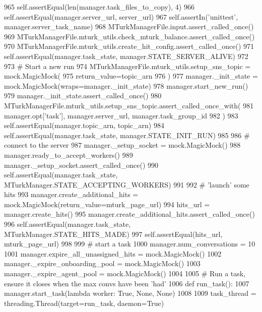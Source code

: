 \begin{DoxyCode}
965         self.assertEqual(len(manager.task\_files\_to\_copy), 4)
966         self.assertEqual(manager.server\_url, server\_url)
967         self.assertIn(\textcolor{stringliteral}{'unittest'}, manager.server\_task\_name)
968         MTurkManagerFile.input.assert\_called\_once()
969         MTurkManagerFile.mturk\_utils.check\_mturk\_balance.assert\_called\_once()
970         MTurkManagerFile.mturk\_utils.create\_hit\_config.assert\_called\_once()
971         self.assertEqual(manager.task\_state, manager.STATE\_SERVER\_ALIVE)
972 
973         \textcolor{comment}{# Start a new run}
974         MTurkManagerFile.mturk\_utils.setup\_sns\_topic = mock.MagicMock(
975             return\_value=topic\_arn
976         )
977         manager.\_init\_state = mock.MagicMock(wraps=manager.\_init\_state)
978         manager.start\_new\_run()
979         manager.\_init\_state.assert\_called\_once()
980         MTurkManagerFile.mturk\_utils.setup\_sns\_topic.assert\_called\_once\_with(
981             manager.opt[\textcolor{stringliteral}{'task'}], manager.server\_url, manager.task\_group\_id
982         )
983         self.assertEqual(manager.topic\_arn, topic\_arn)
984         self.assertEqual(manager.task\_state, manager.STATE\_INIT\_RUN)
985 
986         \textcolor{comment}{# connect to the server}
987         manager.\_setup\_socket = mock.MagicMock()
988         manager.ready\_to\_accept\_workers()
989         manager.\_setup\_socket.assert\_called\_once()
990         self.assertEqual(manager.task\_state, MTurkManager.STATE\_ACCEPTING\_WORKERS)
991 
992         \textcolor{comment}{# 'launch' some hits}
993         manager.create\_additional\_hits = mock.MagicMock(return\_value=mturk\_page\_url)
994         hits\_url = manager.create\_hits()
995         manager.create\_additional\_hits.assert\_called\_once()
996         self.assertEqual(manager.task\_state, MTurkManager.STATE\_HITS\_MADE)
997         self.assertEqual(hits\_url, mturk\_page\_url)
998 
999         \textcolor{comment}{# start a task}
1000         manager.num\_conversations = 10
1001         manager.expire\_all\_unassigned\_hits = mock.MagicMock()
1002         manager.\_expire\_onboarding\_pool = mock.MagicMock()
1003         manager.\_expire\_agent\_pool = mock.MagicMock()
1004 
1005         \textcolor{comment}{# Run a task, ensure it closes when the max convs have been 'had'}
1006         \textcolor{keyword}{def }run\_task():
1007             manager.start\_task(\textcolor{keyword}{lambda} worker: \textcolor{keyword}{True}, \textcolor{keywordtype}{None}, \textcolor{keywordtype}{None})
1008 
1009         task\_thread = threading.Thread(target=run\_task, daemon=\textcolor{keyword}{True})

\end{DoxyCode}

